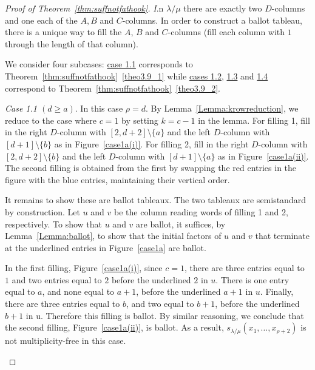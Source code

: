 \documentclass[ALCO,ThmDefs,Unicode,epreuves]{cedram}
\let\hypertargeta\hypertarget %
\let\hyperlinka\hyperlink %
\newenvironment{Case}[1]{\par\vskip2pt\noindent%
\emph{#1}.}{\vskip2pt}
\begin{document}
\begin{proof}[Proof of Theorem~\ref{thm:suffnotfathook}]
\begin{Case}
In $\lambda / \mu$ there are exactly two $D$-columns and one each of the $A,B$ and $C$-columns. In order to construct a ballot tableau, there is a unique way to fill the $A$, $B$ and $C$-columns (fill each column with $1$ through the length of that column). 

We consider four subcases: \hyperlinka{Case 1.1}{case 1.1} corresponds to Theorem~\ref{thm:suffnotfathook}~\ref{theo3.9_1} while \hyperlinka{Case 1.2}{cases 1.2}, \hyperlinka{Case 1.3}{1.3} and \hyperlinka{Case 1.4}{1.4} correspond to Theorem~\ref{thm:suffnotfathook}~\ref{theo3.9_2}. 
\end{Case}

\begin{Case}
{\hypertargeta{Case 1.1}{Case 1.1} $(d\geq a)$} 
In this case $\rho = d$. By Lemma~\ref{Lemma:krowreduction}, we reduce to the case where $c=1$ by setting $k = c-1$ in the lemma. For filling 1, fill in the right $D$-column with $[2,d+2]\setminus\{a\}$ and the left $D$-column with $[d+1]\setminus \{b\}$ as in Figure~\ref{case1a(i)}. For filling 2, fill in the right $D$-column with $[2,d+2]\setminus \{b\}$ and the left $D$-column with $[d+1]\setminus \{a\}$ as in Figure~\ref{case1a(ii)}. The second filling is obtained from the first by swapping the red entries in the figure with the blue entries, maintaining their vertical order.

It remains to show these are ballot tableaux. The two tableaux are semistandard by construction. Let $u$ and $v$ be the column reading words of filling 1 and 2, respectively. To show that $u$ and $v$ are ballot, it suffices, by Lemma~\ref{Lemma:ballot}, to show that the initial factors of $u$ and $v$ that terminate at the underlined entries in Figure~\ref{case1a} are ballot.

In the first filling, Figure~\ref{case1a(i)}, since $c=1$, there are three entries equal to $1$ and two entries equal to $2$ before the underlined $2$ in $u$. There is one entry equal to $a$, and none equal to $a+1$, before the underlined $a+1$ in $u$. Finally, there are three entries equal to $b$, and two equal to $b+1$, before the underlined $b+1$ in u. Therefore this filling is ballot. By similar reasoning, we conclude that the second filling, Figure~\ref{case1a(ii)}, is ballot. As a result, $s_{\lambda/\mu}(x_1,\ldots,x_{\rho+2})$ is not multiplicity-free in this case.


\begin{figure}[htb]\centering
 \begin{subfigure}{0.45\textwidth}
\end{subfigure}
\end{figure}
\end{Case}
\end{proof}
\end{document}
